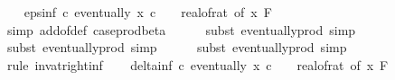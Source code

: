 \begin{isabellebody}
\isanewline
\ \ \isamarkupfalse%
\ eps{\isacharunderscore}{\kern0pt}inf{\isacharcolon}{\kern0pt}\ {\isachardoublequoteopen}{\isasymAnd}c{\isachardot}{\kern0pt}\ eventually\ {\isacharparenleft}{\kern0pt}{\isasymlambda}x{\isachardot}{\kern0pt}\ c\ {\isasymle}\ {}\ {\isacharslash}{\kern0pt}\ {\isacharparenleft}{\kern0pt}real{\isacharunderscore}{\kern0pt}of{\isacharunderscore}{\kern0pt}rat\ {\isacharparenleft}{\kern0pt}{\isasymepsilon}{\isacharunderscore}{\kern0pt}of\ x{\isacharparenright}{\kern0pt}{\isacharparenright}{\kern0pt}{\isacharparenright}{\kern0pt}\ {\isacharquery}{\kern0pt}F{\isachardoublequoteclose}\isanewline
\ \ \ \ \isamarkupfalse%
\ {\isacharparenleft}{\kern0pt}simp\ add{\isacharcolon}{\kern0pt}{\isasymepsilon}{\isacharunderscore}{\kern0pt}of{\isacharunderscore}{\kern0pt}def\ case{\isacharunderscore}{\kern0pt}prod{\isacharunderscore}{\kern0pt}beta{\isacharprime}{\kern0pt}{\isacharparenright}{\kern0pt}\isanewline
\ \ \ \ \isamarkupfalse%
\ {\isacharparenleft}{\kern0pt}subst\ eventually{\isacharunderscore}{\kern0pt}prod{}{\isacharprime}{\kern0pt}{\isacharcomma}{\kern0pt}\ simp{\isacharparenright}{\kern0pt}\isanewline
\ \ \ \ \isamarkupfalse%
\ {\isacharparenleft}{\kern0pt}subst\ eventually{\isacharunderscore}{\kern0pt}prod{}{\isacharprime}{\kern0pt}{\isacharcomma}{\kern0pt}\ simp{\isacharparenright}{\kern0pt}\isanewline
\ \ \ \ \isamarkupfalse%
\ {\isacharparenleft}{\kern0pt}subst\ eventually{\isacharunderscore}{\kern0pt}prod{}{\isacharprime}{\kern0pt}{\isacharcomma}{\kern0pt}\ simp{\isacharparenright}{\kern0pt}\isanewline
\ \ \ \ \isamarkupfalse%
\ {\isacharparenleft}{\kern0pt}rule\ inv{\isacharunderscore}{\kern0pt}at{\isacharunderscore}{\kern0pt}right{\isacharunderscore}{\kern0pt}{}{\isacharunderscore}{\kern0pt}inf{\isacharparenright}{\kern0pt}\isanewline
\isanewline
\ \ \isamarkupfalse%
\ delta{\isacharunderscore}{\kern0pt}inf{\isacharcolon}{\kern0pt}\ {\isachardoublequoteopen}{\isasymAnd}c{\isachardot}{\kern0pt}\ eventually\ {\isacharparenleft}{\kern0pt}{\isasymlambda}x{\isachardot}{\kern0pt}\ c\ {\isasymle}\ {}\ {\isacharslash}{\kern0pt}\ {\isacharparenleft}{\kern0pt}real{\isacharunderscore}{\kern0pt}of{\isacharunderscore}{\kern0pt}rat\ {\isacharparenleft}{\kern0pt}{\isasymdelta}{\isacharunderscore}{\kern0pt}of\ x{\isacharparenright}{\kern0pt}{\isacharparenright}{\kern0pt}{\isacharparenright}{\kern0pt}\ {\isacharquery}{\kern0pt}F{\isachardoublequoteclose}\isanewline

\end{isabellebody}
